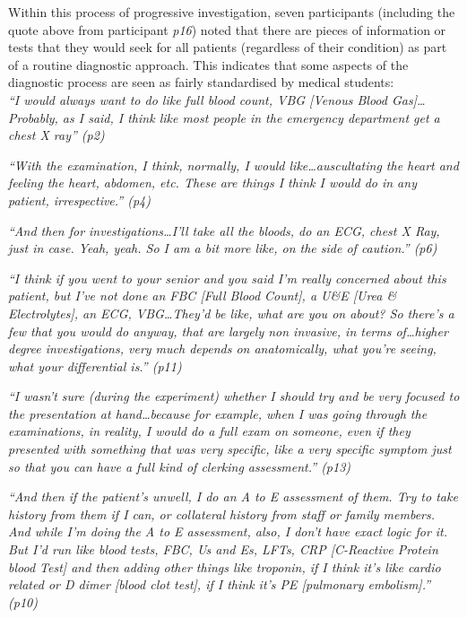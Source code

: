 \documentclass[a4paper, nobind]{templates/ociamthesis}
\begin{document}
Within this process of progressive investigation, seven participants (including the quote above from participant \emph{p16}) noted that there are pieces of information or tests that they would seek for all patients (regardless of their condition) as part of a routine diagnostic approach. This indicates that some aspects of the diagnostic process are seen as fairly standardised by medical students:\\

\emph{``I would always want to do like full blood count, VBG {[}Venous Blood Gas{]}\ldots{} Probably, as I said, I think like most people in the emergency department get a chest X ray'' (p2)}

\emph{``With the examination, I think, normally, I would like\ldots auscultating the heart and feeling the heart, abdomen, etc. These are things I think I would do in any patient, irrespective.'' (p4)}

\emph{``And then for investigations\ldots I'll take all the bloods, do an ECG, chest X Ray, just in case. Yeah, yeah. So I am a bit more like, on the side of caution.'' (p6)}

\emph{``I think if you went to your senior and you said I'm really concerned about this patient, but I've not done an FBC {[}Full Blood Count{]}, a U\&E {[}Urea \& Electrolytes{]}, an ECG, VBG\ldots They'd be like, what are you on about? So there's a few that you would do anyway, that are largely non invasive, in terms of\ldots higher degree investigations, very much depends on anatomically, what you're seeing, what your differential is.'' (p11)}

\emph{``I wasn't sure (during the experiment) whether I should try and be very focused to the presentation at hand\ldots because for example, when I was going through the examinations, in reality, I would do a full exam on someone, even if they presented with something that was very specific, like a very specific symptom just so that you can have a full kind of clerking assessment.'' (p13)}

\emph{``And then if the patient's unwell, I do an A to E assessment of them. Try to take history from them if I can, or collateral history from staff or family members. And while I'm doing the A to E assessment, also, I don't have exact logic for it. But I'd run like blood tests, FBC, Us and Es, LFTs, CRP {[}C-Reactive Protein blood Test{]} and then adding other things like troponin, if I think it's like cardio related or D dimer {[}blood clot test{]}, if I think it's PE {[}pulmonary embolism{]}.'' (p10)}
\end{document}

